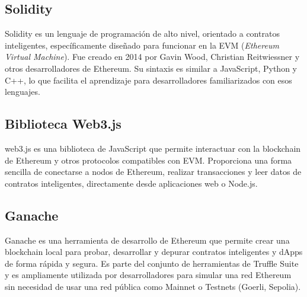 




\subsection{Solidity}

Solidity \cite{solidity} es un lenguaje de programación de alto nivel, orientado a contratos inteligentes, específicamente diseñado para funcionar en la EVM (\textit{Ethereum Virtual Machine}). Fue creado en 2014 por Gavin Wood, Christian Reitwiessner y otros desarrolladores de Ethereum. Su sintaxis es similar a JavaScript, Python y C++, lo que facilita el aprendizaje para desarrolladores familiarizados con esos lenguajes. 


\subsection{Biblioteca Web3.js}

web3.js \citep{web3} es una biblioteca de JavaScript que permite interactuar con la blockchain de Ethereum y otros protocolos compatibles con EVM. Proporciona una forma sencilla de conectarse a nodos de Ethereum, realizar transacciones y leer datos de contratos inteligentes, directamente desde aplicaciones web o Node.js.


\subsection{Ganache}

Ganache \cite{ganache_website} es una herramienta de desarrollo de Ethereum que permite crear una blockchain local para probar, desarrollar y depurar contratos inteligentes y dApps de forma rápida y segura. Es parte del conjunto de herramientas de Truffle Suite y es ampliamente utilizada por desarrolladores para simular una red Ethereum sin necesidad de usar una red pública como Mainnet o Testnets (Goerli, Sepolia).


